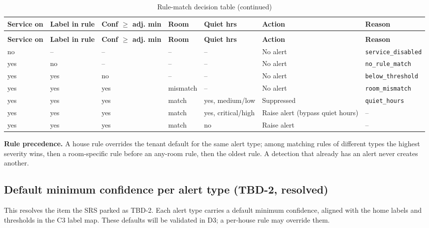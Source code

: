 \begin{longtable}{L{1.9cm}L{2.0cm}L{1.6cm}L{1.6cm}L{2.2cm}L{2.6cm}L{2.3cm}}
\caption{Rule-match decision table}\label{tab:c2-dt-match}\\
\toprule
\textbf{Service on} & \textbf{Label in rule} & \textbf{Conf $\geq$ adj. min} & \textbf{Room} & \textbf{Quiet hrs} & \textbf{Action} & \textbf{Reason} \\
\midrule
\endfirsthead
\caption[]{Rule-match decision table (continued)}\\
\toprule
\textbf{Service on} & \textbf{Label in rule} & \textbf{Conf $\geq$ adj. min} & \textbf{Room} & \textbf{Quiet hrs} & \textbf{Action} & \textbf{Reason} \\
\midrule
\endhead
no & -- & -- & -- & -- & No alert & \texttt{service\_disabled} \\
yes & no & -- & -- & -- & No alert & \texttt{no\_rule\_match} \\
yes & yes & no & -- & -- & No alert & \texttt{below\_threshold} \\
yes & yes & yes & mismatch & -- & No alert & \texttt{room\_mismatch} \\
yes & yes & yes & match & yes, medium/low & Suppressed & \texttt{quiet\_hours} \\
yes & yes & yes & match & yes, critical/high & Raise alert (bypass quiet hours) & -- \\
yes & yes & yes & match & no & Raise alert & -- \\
\bottomrule
\end{longtable}

\textbf{Rule precedence.} A house rule overrides the tenant default for the same alert type; among matching
rules of different types the highest severity wins, then a room-specific rule before an any-room rule, then the oldest
rule. A detection that already has an alert never creates another.

\subsection{Default minimum confidence per alert type (TBD-2, resolved)}
This resolves the item the SRS parked as TBD-2. Each alert type carries a default minimum confidence,
aligned with the home labels and thresholds in the C3 label map. These defaults will be validated in D3; a
per-house rule may override them.

